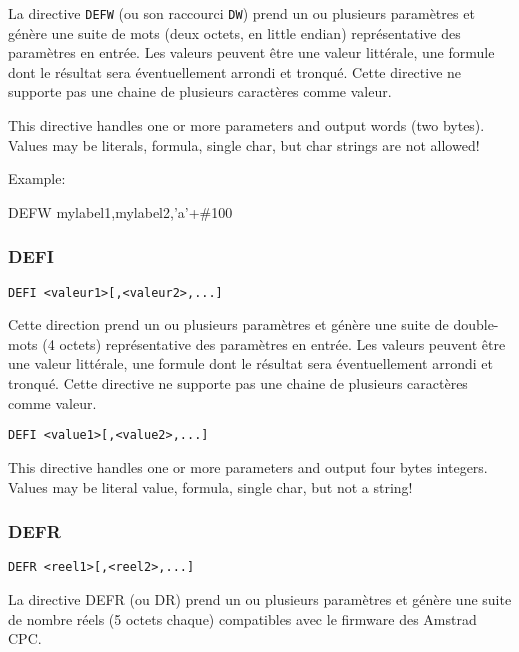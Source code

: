 \begin{xfr}
La directive \texttt{DEFW} (ou son raccourci \texttt{DW}) prend un ou plusieurs paramètres et génère une suite de mots (deux octets, en little endian) représentative des paramètres en entrée.
Les valeurs peuvent être une valeur littérale, une formule dont le résultat sera éventuellement arrondi et tronqué.
Cette directive ne supporte pas une chaine de plusieurs caractères comme valeur.
\end{xfr}

\begin{xen}
This directive handles one or more parameters and output words (two bytes). Values may be literals, formula, single char, but char strings are not allowed!
\end{xen}

Example:
\begin{code}
DEFW mylabel1,mylabel2,'a'+\#100
\end{code}

\subsubsection{DEFI}
\begin{xfr}
\begin{verbatim}
DEFI <valeur1>[,<valeur2>,...]
\end{verbatim}

Cette direction prend un ou plusieurs paramètres et génère une suite de double-mots (4 octets) représentative des paramètres en entrée. Les valeurs peuvent être une valeur littérale, une formule dont le résultat sera éventuellement arrondi et tronqué. Cette directive ne supporte pas une chaine de plusieurs caractères comme valeur.
\end{xfr}

\begin{xen}
\begin{verbatim}
DEFI <value1>[,<value2>,...]
\end{verbatim}

This directive handles one or more parameters and output four bytes integers.
Values may be literal value, formula, single char, but not a string!
\end{xen}

\subsubsection{DEFR}

\begin{xfr}
\begin{verbatim}
DEFR <reel1>[,<reel2>,...]
\end{verbatim}

La directive DEFR (ou DR) prend un ou plusieurs paramètres et génère une suite de nombre réels (5 octets chaque) compatibles avec le firmware des Amstrad CPC.
\end{xfr}


